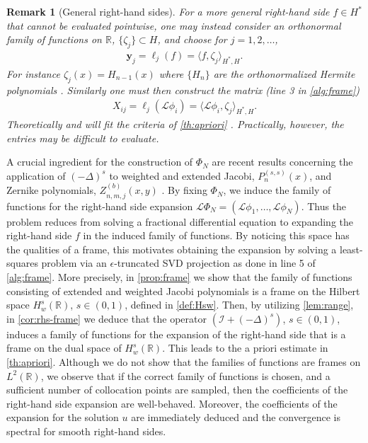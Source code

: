 \documentclass[10pt,a4paper]{article}
\newtheorem{remark}{Remark}[section]
\numberwithin{equation}{section}
\begin{document}
\begin{remark}[General right-hand sides]
For a more general right-hand side $f \in H^*$ that cannot be evaluated pointwise, one may instead consider an orthonormal family of functions on $\mathbb{R}$, $\{\zeta_j \} \subset H$, and choose for $j=1,2,\dots$,
\begin{align}
{\mathbf y}_j = \ell_j(f) = \langle f, \zeta_{j} \rangle_{H^*, H}.
\label{eq:f1}
\end{align}
For instance $\zeta_j(x) = H_{n-1}(x)$ where $\{H_n\}$ are the orthonormalized Hermite polynomials \cite[Sec.~18.3]{OlverNIST}. Similarly one must then construct the matrix (line 3 in \cref{alg:frame})
\begin{align}
X_{ij} = \ell_j(\mathcal{L} \phi_i) = \langle \mathcal{L}\phi_i, \zeta_{j}\rangle_{H^*, H}.
\label{eq:f2}
\end{align}
Theoretically  and  will fit the criteria of \cref{th:apriori} \cite[Sec.~5.1]{Adcock2020}. Practically, however, the entries may be difficult to evaluate. 
\end{remark}



A crucial ingredient  for the construction of $\Phi_N$  are recent results concerning the application of $(-\Delta)^s$ to weighted and extended Jacobi, $P^{(s,s)}_n(x)$, and Zernike polynomials, $Z^{(b)}_{n,m,j}(x,y)$ \cite{Gutleb2023}. By fixing $\Phi_N$, we induce the family of functions for the right-hand side expansion $\mathcal{L}\Phi_N = (\mathcal{L}\phi_1, \dots, \mathcal{L}\phi_N)$. Thus the problem reduces from solving a fractional differential equation to expanding the right-hand side $f$ in the induced family of functions. By noticing this space has the qualities of a frame, this motivates obtaining the expansion by solving a least-squares problem via an $\epsilon$-truncated SVD projection  as done in line 5 of \cref{alg:frame}.  More precisely, in \cref{prop:frame} we show that the family of functions consisting of extended and weighted Jacobi polynomials is a frame on the Hilbert space $H^s_w(\mathbb{R})$,  $s \in (0,1)$,  defined in \cref{def:Hsw}. Then, by utilizing \cref{lem:range}, in \cref{cor:rhs-frame} we deduce that the operator $(\mathcal{I}+(-\Delta)^s)$,  $s \in (0,1)$,  induces a family of functions for the expansion of the right-hand side that is a frame on the dual space of $H^s_w(\mathbb{R})$.  This leads to the a priori estimate in \cref{th:apriori}.  Although we do not show that the families of functions are frames on $L^2(\mathbb{R})$, we observe that if the correct family of functions is chosen, and a sufficient number of collocation points are sampled, then the coefficients of the right-hand side expansion are well-behaved. Moreover, the coefficients of the expansion for the solution $u$ are immediately deduced and the convergence is spectral for smooth right-hand sides.
\end{document}
